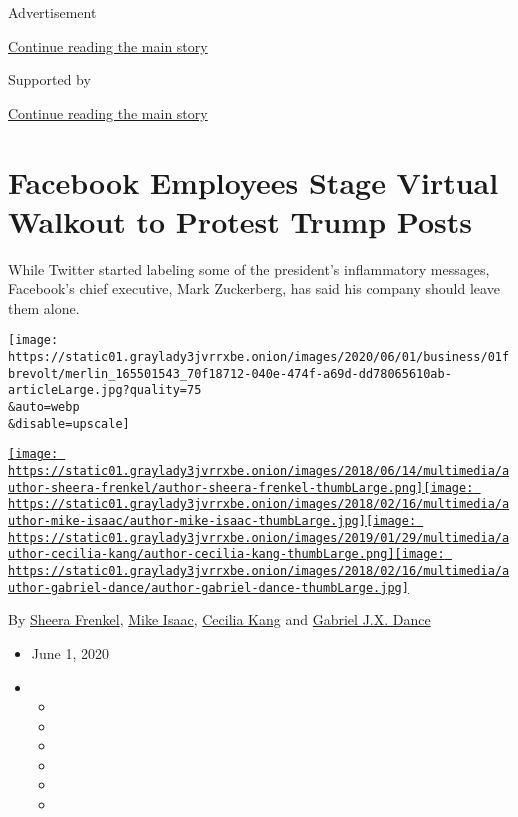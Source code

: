 Advertisement

\protect\hyperlink{after-top}{Continue reading the main story}

Supported by

\protect\hyperlink{after-sponsor}{Continue reading the main story}

\hypertarget{facebook-employees-stage-virtual-walkout-to-protest-trump-posts}{%
\section{Facebook Employees Stage Virtual Walkout to Protest Trump
Posts}\label{facebook-employees-stage-virtual-walkout-to-protest-trump-posts}}

While Twitter started labeling some of the president's inflammatory
messages, Facebook's chief executive, Mark Zuckerberg, has said his
company should leave them alone.

\texttt{[image: https://static01.graylady3jvrrxbe.onion/images/2020/06/01/business/01fbrevolt/merlin\_165501543\_70f18712-040e-474f-a69d-dd78065610ab-articleLarge.jpg?quality=75\\\&auto=webp\\\&disable=upscale]}

\href{https://www.nytimes3xbfgragh.onion/by/sheera-frenkel}{\texttt{[image: https://static01.graylady3jvrrxbe.onion/images/2018/06/14/multimedia/author-sheera-frenkel/author-sheera-frenkel-thumbLarge.png]}}\href{https://www.nytimes3xbfgragh.onion/by/mike-isaac}{\texttt{[image: https://static01.graylady3jvrrxbe.onion/images/2018/02/16/multimedia/author-mike-isaac/author-mike-isaac-thumbLarge.jpg]}}\href{https://www.nytimes3xbfgragh.onion/by/cecilia-kang}{\texttt{[image: https://static01.graylady3jvrrxbe.onion/images/2019/01/29/multimedia/author-cecilia-kang/author-cecilia-kang-thumbLarge.png]}}\href{https://www.nytimes3xbfgragh.onion/by/gabriel-dance}{\texttt{[image: https://static01.graylady3jvrrxbe.onion/images/2018/02/16/multimedia/author-gabriel-dance/author-gabriel-dance-thumbLarge.jpg]}}

By \href{https://www.nytimes3xbfgragh.onion/by/sheera-frenkel}{Sheera
Frenkel}, \href{https://www.nytimes3xbfgragh.onion/by/mike-isaac}{Mike
Isaac},
\href{https://www.nytimes3xbfgragh.onion/by/cecilia-kang}{Cecilia Kang}
and \href{https://www.nytimes3xbfgragh.onion/by/gabriel-dance}{Gabriel
J.X. Dance}

\begin{itemize}
\item
  June 1, 2020
\item
  \begin{itemize}
  \item
  \item
  \item
  \item
  \item
  \item
  \end{itemize}
\end{itemize}

